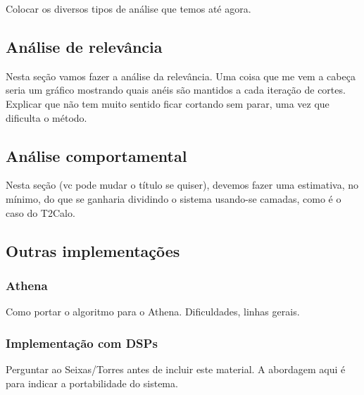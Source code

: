 Colocar os diversos tipos de análise que temos até agora.

\subsection{Análise de relevância}

Nesta seção vamos fazer a análise da relevância. Uma coisa que me vem a cabeça
seria um gráfico mostrando quais anéis são mantidos a cada iteração de
cortes. Explicar que não tem muito sentido ficar cortando sem parar, uma vez
que dificulta o método.

\subsection{Análise comportamental}

Nesta seção (vc pode mudar o título se quiser), devemos fazer uma estimativa,
no mínimo, do que se ganharia dividindo o sistema usando-se camadas, como é o
caso do T2Calo.

\subsection{Outras implementações}

\subsubsection{Athena}

Como portar o algoritmo para o Athena. Dificuldades, linhas gerais.

\subsubsection{Implementação com DSPs}

Perguntar ao Seixas/Torres antes de incluir este material. A abordagem aqui é
para indicar a portabilidade do sistema.

